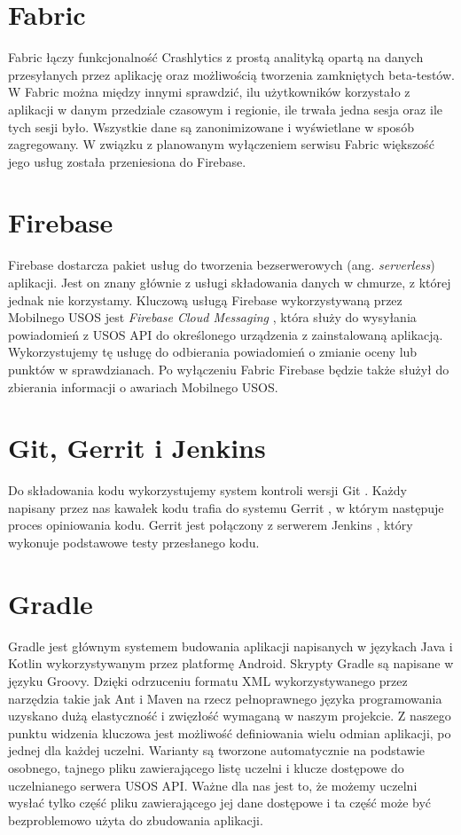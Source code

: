 \documentclass{pracamgr}
\begin{document}
\section{Fabric}

Fabric \cite{fabric} łączy funkcjonalność Crashlytics z prostą analityką opartą na
danych przesyłanych przez aplikację oraz możliwością tworzenia zamkniętych
beta-testów. W Fabric można między innymi sprawdzić, ilu użytkowników korzystało
z aplikacji w danym przedziale czasowym i regionie, ile trwała jedna sesja oraz
ile tych sesji było. Wszystkie dane są zanonimizowane i wyświetlane w sposób
zagregowany. W związku z planowanym wyłączeniem serwisu Fabric większość jego
usług została przeniesiona do Firebase.

\section{Firebase}

Firebase \cite{firebase} dostarcza pakiet usług do tworzenia bezserwerowych
(ang. \textit{serverless}) aplikacji. Jest on znany głównie z usługi składowania
danych w chmurze, z której jednak nie korzystamy. Kluczową usługą Firebase
wykorzystywaną przez Mobilnego USOS jest \textit{Firebase Cloud Messaging}
\cite{firebasecm}, która służy do wysyłania powiadomień z USOS API do określonego
urządzenia z zainstalowaną aplikacją. Wykorzystujemy tę usługę do odbierania
powiadomień o zmianie oceny lub punktów w sprawdzianach. Po wyłączeniu Fabric
Firebase będzie także służył do zbierania informacji o awariach Mobilnego USOS.

\section{Git, Gerrit i Jenkins}

Do składowania kodu wykorzystujemy system kontroli wersji Git \cite{git}. Każdy
napisany przez nas kawałek kodu trafia do systemu Gerrit \cite{gerrit}, w którym
następuje proces opiniowania kodu. Gerrit jest połączony z serwerem Jenkins
\cite{jenkins}, który wykonuje podstawowe testy przesłanego kodu.

\section{Gradle}

Gradle \cite{gradle} jest głównym systemem budowania aplikacji napisanych w
językach Java i Kotlin wykorzystywanym przez platformę Android. Skrypty Gradle
są napisane w języku Groovy. Dzięki odrzuceniu formatu XML wykorzystywanego przez
narzędzia takie jak Ant i Maven na rzecz pełnoprawnego języka programowania
uzyskano dużą elastyczność i zwięzłość wymaganą w naszym projekcie. Z naszego
punktu widzenia kluczowa jest możliwość definiowania wielu odmian aplikacji, po
jednej dla każdej uczelni. Warianty są tworzone automatycznie na podstawie osobnego,
tajnego pliku zawierającego listę uczelni i klucze dostępowe do uczelnianego serwera
USOS API. Ważne dla nas jest to, że możemy uczelni wysłać tylko część pliku zawierającego
jej dane dostępowe i ta część może być bezproblemowo użyta do zbudowania aplikacji.
\end{document}

